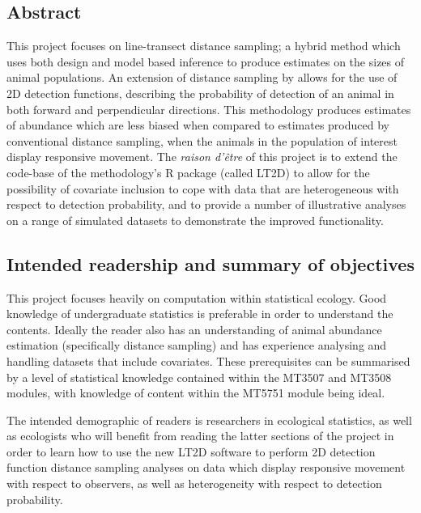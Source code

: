 \documentclass[11pt]{article}
\begin{document}
\tableofcontents
{}
\newpage
\begin{multicols}{2}

\newpage

\section{Abstract}
This project focuses on line-transect distance sampling; a hybrid method which uses both design and model based inference to produce estimates on the sizes of animal populations. An extension of distance sampling by \cite{Borchers} allows for the use of 2D detection functions, describing the probability of detection of an animal in both forward and perpendicular directions. This methodology produces estimates of abundance which are less biased when compared to estimates produced by conventional distance sampling, when the animals in the population of interest display responsive movement. The \textit{raison d'être} of this project is to extend the code-base of the \cite{Borchers} methodology's R package (called LT2D) to allow for the possibility of covariate inclusion to cope with data that are heterogeneous with respect to detection probability, and to provide a number of illustrative analyses on a range of simulated datasets to demonstrate the improved functionality.

\subsection{Intended readership and summary of objectives}
This project focuses heavily on computation within statistical ecology. Good knowledge of undergraduate statistics is preferable in order to understand the contents. Ideally the reader also has an understanding of animal abundance estimation (specifically distance sampling) and has experience analysing and handling datasets that include covariates. These prerequisites can be summarised by a level of statistical knowledge contained within the MT3507 and MT3508 modules, with knowledge of content within the MT5751 module being ideal.

The intended demographic of readers is researchers in ecological statistics, as well as ecologists who will benefit from reading the latter sections of the project in order to learn how to use the new LT2D software to perform 2D detection function distance sampling analyses on data which display responsive movement with respect to observers, as well as heterogeneity with respect to detection probability. 


\end{multicols}
\end{document}
